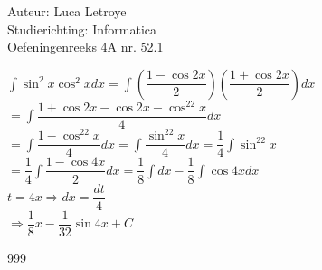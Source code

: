 \documentclass[a4paper]{article}
\newcommand{\dint}{\displaystyle\int}
\begin{document}
  
\noindent \large Auteur: Luca Letroye \\
\noindent \large Studierichting: Informatica\\
\noindent \large Oefeningenreeks 4A nr. 52.1

\medskip
\normalsize

$\dint \sin^2x\cos^2xdx  = \dint\left(\dfrac{1-\cos2x}{2}\right)\left(\dfrac{1+\cos2x}{2}\right)dx$\\

$= \dint \dfrac{1+\cos2x -\cos2x-\cos^22x}{4}dx$\\

$=\dint \dfrac{1-\cos^22x}{4}dx = \dint\dfrac{\sin^22x}{4}dx = \dfrac{1}{4}\dint\sin^22x$\\

$= \dfrac{1}{4}\dint\dfrac{1-\cos4x}{2}dx = \dfrac{1}{8}\dint dx - \dfrac{1}{8}\dint \cos4xdx$\\

$t = 4x \Rightarrow dx = \dfrac{dt}{4}$\\

$\Rightarrow \dfrac{1}{8}x - \dfrac{1}{32}\sin 4x +C$\\





\begin{thebibliography}{999}
\end{thebibliography}
\end{document}
